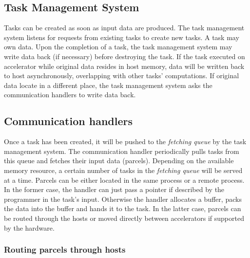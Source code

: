 \subsection{Task Management System}
Tasks can be created as soon as input data are produced.
The task management system listens for requests from existing tasks to create new tasks.
A task may own data.
Upon the completion of a task, the task management system may write data back (if necessary) before destroying the task.
If the task executed on accelerator while original data resides in host memory, data will be written back to host asynchronously, overlapping with other tasks' computations.
If original data locate in a different place, the task management system asks the communication handlers to write data back.

\subsection{Communication handlers}
Once a task has been created, it will be pushed to the {\em fetching queue} by the task management system.
The communication handler periodically pulls tasks from this queue and fetches their input data (parcels).
Depending on the available memory resource, a certain number of tasks in the {\em fetching queue} will be served at a time.
Parcels can be either located in the same process or a remote process.
In the former case, the handler can just pass a pointer if described by the programmer in the task's input.
Otherwise the handler allocates a buffer, packs the data into the buffer and hands it to the task.
In the latter case, parcels can be routed through the hosts or moved directly between accelerators if supported by the hardware.

\subsubsection{Routing parcels through hosts}

